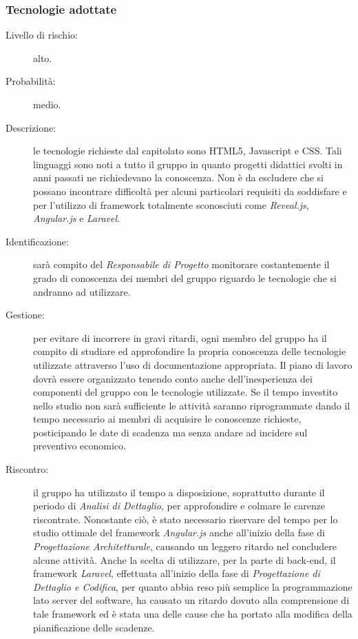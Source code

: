 \subsubsection{Tecnologie adottate}
\begin{description}
	\item[Livello di rischio:] alto.
	\item[Probabilità:] medio.
	\item[Descrizione:] le tecnologie richieste dal capitolato sono \gls{HTML5}, \gls{Javascript} e \gls{CSS}. Tali linguaggi sono noti a tutto il gruppo in quanto progetti didattici svolti in anni passati ne richiedevano la conoscenza. Non è da escludere che si possano incontrare difficoltà per alcuni particolari requisiti da soddisfare e per l'utilizzo di \gls{framework} totalmente sconosciuti come \textit{\gls{Reveal.js}}, \textit{\gls{Angular.js}} e \textit{\gls{Laravel}}.
	\item[Identificazione:] sarà compito del \textit{Responsabile di Progetto} monitorare costantemente il grado di conoscenza dei membri del gruppo riguardo le tecnologie che si andranno ad utilizzare.
	\item[Gestione:] per evitare di incorrere in gravi ritardi, ogni membro del gruppo ha il compito di studiare ed approfondire la propria conoscenza delle tecnologie utilizzate attraverso l'uso di documentazione appropriata. Il piano di lavoro dovrà essere organizzato tenendo conto anche dell'inesperienza dei componenti del gruppo con le tecnologie utilizzate. Se il tempo investito nello studio non sarà sufficiente le attività saranno riprogrammate dando il tempo necessario ai membri di acquisire le conoscenze richieste, posticipando le date di scadenza ma senza andare ad incidere sul preventivo economico.
	\item[Riscontro:] il gruppo ha utilizzato il tempo a disposizione, soprattutto durante il periodo di \textit{Analisi di Dettaglio}, per approfondire e colmare le carenze riscontrate. Nonostante ciò, è stato necessario riservare del tempo per lo studio ottimale del \gls{framework} \textit{\gls{Angular.js}} anche all'inizio della fase di \textit{Progettazione Architetturale}, causando un leggero ritardo nel concludere alcune attività. Anche la scelta di utilizzare, per la parte di \gls{back-end}, il \gls{framework} \textit{\gls{Laravel}}, effettuata all'inizio della fase di \textit{Progettazione di Dettaglio e Codifica}, per quanto abbia reso più semplice la programmazione lato server del software, ha causato un ritardo dovuto alla comprensione di tale \gls{framework} ed è stata una delle cause che ha portato alla modifica della pianificazione delle scadenze.
\end{description}
